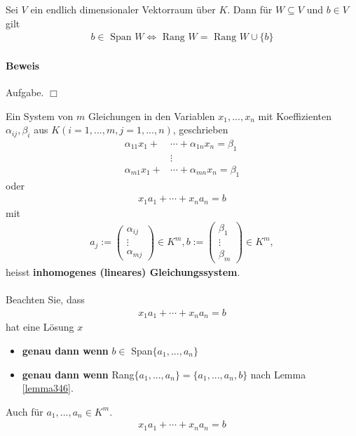 \documentclass[11pt]{report}
\newcommand*\f[1] {\textbf{#1}}
\begin{document}
\begin{lemma}
\label{lemma346}
Sei $V$ ein endlich dimensionaler Vektorraum über $K$. Dann für $W \subseteq V$ und $b \in V$ gilt
\begin{align}
 b \in \text{ Span } W \Leftrightarrow \text{ Rang } W = \text{ Rang } W \cup \{b\}
\end{align}
\end{lemma}
\paragraph{Beweis} Aufgabe. \hfill $\Box$

Ein System von $m$ Gleichungen in den Variablen $x_1, ..., x_n$ mit Koeffizienten $\alpha_{ij}, \beta_i$ aus $K (i=1, ..., m, j=1, ..., n)$, geschrieben
\begin{align}
 \alpha_{11} x_1 + &\cdots + \alpha_{1n} x_n= \beta_1 \\
 &\vdots \\
 \alpha_{m1} x_1 + &\cdots + \alpha_{mn} x_n= \beta_1 
\end{align}
oder
\begin{align}
 x_1 a_1 + \cdots + x_n a_n = b
\end{align}
mit
\begin{align}
 a_j := \begin{pmatrix} \alpha_{ij} \\ \vdots \\ \alpha_{mj} \end{pmatrix} \in K^m, b := \begin{pmatrix} \beta_{1} \\ \vdots \\ \beta_{m} \end{pmatrix} \in K^m, 
\end{align}
heisst \f{inhomogenes (lineares) Gleichungssystem}.\\\\
Beachten Sie, dass
\begin{align}
 x_1 a_1 + \cdots + x_n a_n = b 
\end{align}
hat eine Lösung $x$
\begin{itemize}
 \item \f{genau dann wenn} $b \in$ Span$\{a_1, ..., a_n\}$
 \item \f{genau dann wenn} Rang$\{a_1, ..., a_n\} = \{a_1, ..., a_n, b\}$ nach Lemma \ref{lemma346}.
\end{itemize}
Auch für $a_1, ..., a_n \in K^m$.
\begin{align}
 x_1 a_1 + \cdots + x_n a_n = b
\end{align}
\end{document}
